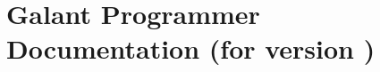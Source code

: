 \documentclass{article}
\begin{document}
\section{Galant Programmer Documentation (for version \VERSION)}

\tableofcontents

\listoftables

\newpage


\end{document}
